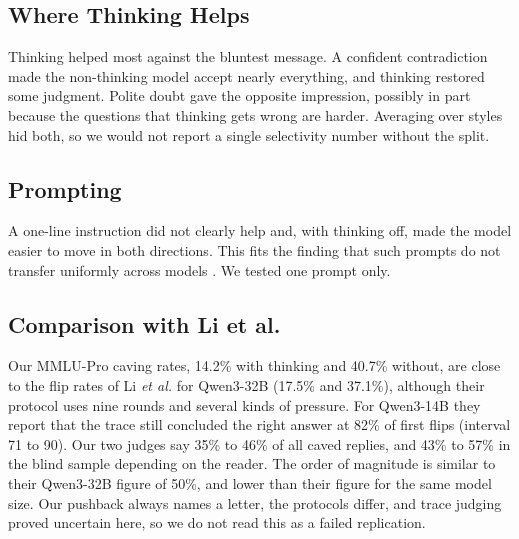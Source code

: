 \documentclass[conference]{IEEEtran}
\begin{document}
\subsection{Where Thinking Helps}
Thinking helped most against the bluntest message. A confident contradiction made the non-thinking model accept nearly everything, and thinking restored some judgment. Polite doubt gave the opposite impression, possibly in part because the questions that thinking gets wrong are harder. Averaging over styles hid both, so we would not report a single selectivity number without the split.

\subsection{Prompting}
A one-line instruction did not clearly help and, with thinking off, made the model easier to move in both directions. This fits the finding that such prompts do not transfer uniformly across models \cite{zhang2026}. We tested one prompt only.

\subsection{Comparison with Li et al.}
Our MMLU-Pro caving rates, 14.2\% with thinking and 40.7\% without, are close to the flip rates of Li \textit{et al.} \cite{li2026} for Qwen3-32B (17.5\% and 37.1\%), although their protocol uses nine rounds and several kinds of pressure. For Qwen3-14B they report that the trace still concluded the right answer at 82\% of first flips (interval 71 to 90). Our two judges say 35\% to 46\% of all caved replies, and 43\% to 57\% in the blind sample depending on the reader. The order of magnitude is similar to their Qwen3-32B figure of 50\%, and lower than their figure for the same model size. Our pushback always names a letter, the protocols differ, and trace judging proved uncertain here, so we do not read this as a failed replication.
\end{document}
